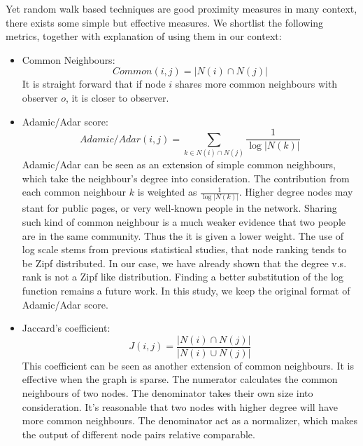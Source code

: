 \documentclass[11pt,a4paper]{article}
\begin{document}
Yet random walk based techniques are good proximity measures in many context, 
there exists some simple but effective measures. We shortlist the following 
metrics, together with explanation of using them in our context:
	\begin{itemize}
		\item Common Neighbours:
		\begin{equation}
			Common(i,j) = | N(i) \cap N(j) |
			\label{eq:common}
		\end{equation}
		It is straight forward that if node $i$ shares more common neighbours 
		with observer $o$, it is closer to observer. 
		
		\item Adamic/Adar score:
		\begin{equation}
			Adamic/Adar(i,j) = \sum_{k \in N(i) \cap N(j) }{\frac{1}{\log{|N(k)|}}}
			\label{eq:adar}
		\end{equation}
		Adamic/Adar can be seen as an extension of simple common neighbours, which 
		take the neighbour's degree into consideration. The contribution from 
		each common neighbour $k$ is weighted as $\frac{1}{\log{|N(k)|}}$. 
		Higher degree nodes may stant for public pages, or very well-known people 
		in the network. Sharing such kind of common neighbour is a much weaker 
		evidence that two people are in the same community. Thus the it is given 
		a lower weight. The use of log scale stems from previous statistical studies, 
		that node ranking tends to be Zipf distributed\cite{breslau1999web-zipf}. 
		In our case, we have already shown that the degree v.s. rank is not a Zipf 
		like distribution. Finding a better substitution of the log function 
		remains a future work. In this study, we keep the original format of 
		Adamic/Adar score. 
		
		\item Jaccard's coefficient:
		\begin{equation}
			J(i,j)=\frac{|N(i) \cap N(j) |}{|N(i) \cup N(j) |}
			\label{jaccards}
		\end{equation}
		This coefficient can be seen as another extension of common neighbours. 
		It is effective when the graph is sparse. The numerator calculates the 
		common neighbours of two nodes. The denominator takes their own size
		into consideration. It's reasonable that two nodes with higher degree 
		will have more common neighbours. The denominator act as a normalizer, 
		which makes the output of different node pairs relative comparable. 
	\end{itemize}
\end{document}
